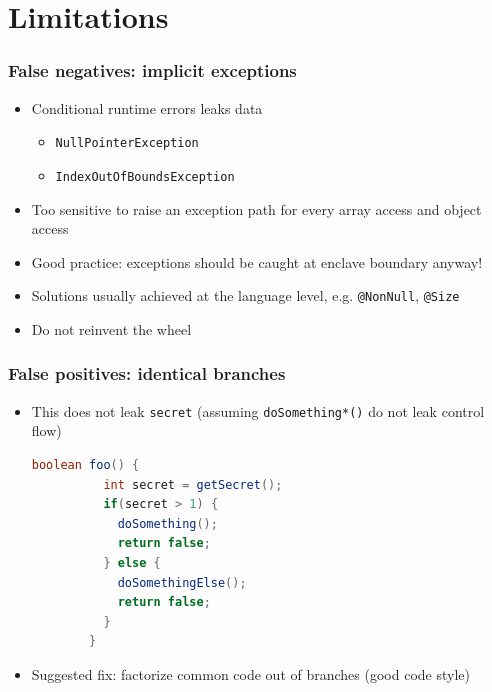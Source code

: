 \documentclass{beamer}
\newcommand{\code}[1]{\colorbox{code}{\texttt{\footnotesize #1}}}
\begin{document}
\section{Limitations}
\begin{frame}
  \frametitle{False negatives: implicit exceptions}
  \begin{itemize}
    \item Conditional runtime errors leaks data
      \begin{itemize}
        \item \code{NullPointerException}
        \item \code{IndexOutOfBoundsException}
      \end{itemize}
    \item Too sensitive to raise an exception path for every array access and object access
    \item Good practice: exceptions should be caught at enclave boundary anyway!
    \item Solutions usually achieved at the language level,
      e.g. \code{@NonNull}, \code{@Size}
    \item Do not reinvent the wheel
  \end{itemize}
\end{frame}

\begin{frame}[fragile]
  \frametitle{False positives: identical branches}
  \begin{itemize}
    \item This does not leak \code{secret}
      (assuming \code{doSomething*()} do not leak control flow)
      \begin{lstlisting}[style=j, language=java, gobble=6, tabsize=2]
        boolean foo() {
          int secret = getSecret();
          if(secret > 1) {
            doSomething();
            return false;
          } else {
            doSomethingElse();
            return false;
          }
        }
      \end{lstlisting}
    \item Suggested fix: factorize common code out of branches (good code style)
  \end{itemize}
\end{frame}
\end{document}

